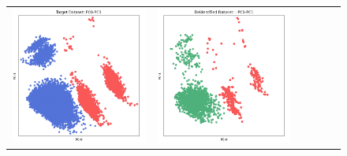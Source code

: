 \begin{figure}[p!]
\begin{tabular}{@{} M{0.166\textwidth} M{0.166\textwidth} | M{0.166\textwidth} M{0.166\textwidth} | M{0.166\textwidth} M{0.166\textwidth} @{}}
       \includegraphics[width=\linewidth]{z_Genetic.orig.png} &
       \includegraphics[width=\linewidth]{z_Genetic.syn.png} \\ 

\end{tabular}
\end{figure}
